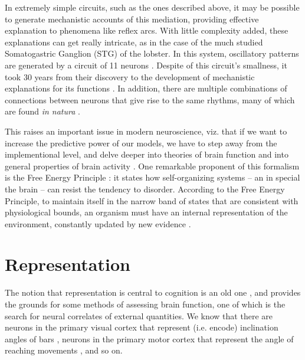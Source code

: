     In extremely simple circuits, such as the ones described above, it may be possible to generate mechanistic accounts of this mediation, providing effective explanation to phenomena like reflex arcs. With little complexity added, these explanations can get really intricate, as in the case of the much studied Somatogastric Ganglion (STG) of the lobster. In this system, oscillatory patterns are generated by a circuit of 11 neurons \cite{selverston2009neural}. Despite of this circuit's smallness, it took 30 years from their discovery to the development of mechanistic explanations for its functions \cite{bal1988pyloric, selverston2009neural}. In addition, there are multiple combinations of connections between neurons that give rise to the same rhythms, many of which are found \textit{in natura} \cite{prinz2004similar}. 
    
    
    This raises an important issue in modern neuroscience, viz. that if we want to increase the predictive power of our models, we have to step away from the implementional level, and delve deeper into theories of brain function and into general properties of brain activity \cite{gerstner2012theory}. One remarkable proponent of this formalism is the Free Energy Principle \cite{friston2009free}: it states how self-organizing systems -- an in special the brain -- can resist the tendency to disorder. According to the Free Energy Principle, to maintain itself in the narrow band of states that are consistent with physiological bounds, an organism must have an internal representation of the environment, constantly updated by new evidence \cite{friston2009free}.

\section{Representation}
\label{sec:representation}
    The notion that representation is central to cognition is an old one \cite[p.~134-140]{rosch1991embodied}, and provides the grounds for some methods of assessing brain function, one of which is the search for neural correlates of external quantities. We know that there are neurons in the primary visual cortex that represent (i.e. encode) inclination angles of bars \cite[p.~13]{dayan2001theoretical}, neurons in the primary motor cortex that represent the angle of reaching movements \cite[p.~14]{dayan2001theoretical}, and so on.
    
